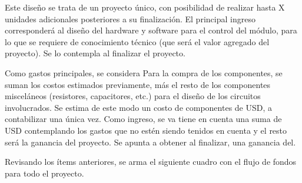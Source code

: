 
Este diseño se trata de un proyecto único, con posibilidad de realizar hasta X unidades adicionales posteriores a
su finalización.
El principal ingreso corresponderá al diseño del hardware y software para el control del módulo, para lo que se
requiere de conocimiento técnico (que será el valor agregado del proyecto). Se lo contempla al finalizar el
proyecto.


Como gastos principales, se considera \TBD
Para la compra de los componentes, se suman los costos estimados previamente, más el resto de los
componentes misceláneos (resistores, capacitores, etc.) para el diseño de los circuitos involucrados. Se estima
de este modo un costo de componentes de \TBD USD, a contabilizar una única vez.
Como ingreso, se va tiene en cuenta una suma de \TBD USD contemplando los gastos que no estén siendo tenidos
en cuenta y el resto será la ganancia del proyecto. Se apunta a obtener al finalizar, una ganancia del.

Revisando los ítems anteriores, se arma el siguiente cuadro con el flujo de fondos para todo el proyecto.

